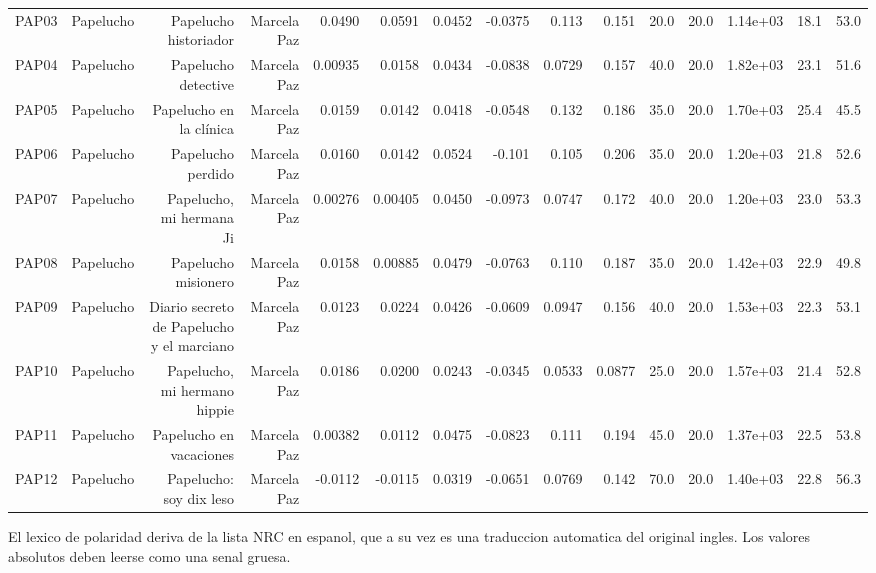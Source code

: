 \begin{table}[htbp]
\begin{tabular}{lrrrrrrrrrrrrrr}
PAP03 & Papelucho & Papelucho historiador & Marcela Paz & 0.0490 & 0.0591 & 0.0452 & -0.0375 & 0.113 & 0.151 & 20.0 & 20.0 & 1.14e+03 & 18.1 & 53.0 \\
PAP04 & Papelucho & Papelucho detective & Marcela Paz & 0.00935 & 0.0158 & 0.0434 & -0.0838 & 0.0729 & 0.157 & 40.0 & 20.0 & 1.82e+03 & 23.1 & 51.6 \\
PAP05 & Papelucho & Papelucho en la clínica & Marcela Paz & 0.0159 & 0.0142 & 0.0418 & -0.0548 & 0.132 & 0.186 & 35.0 & 20.0 & 1.70e+03 & 25.4 & 45.5 \\
PAP06 & Papelucho & Papelucho perdido & Marcela Paz & 0.0160 & 0.0142 & 0.0524 & -0.101 & 0.105 & 0.206 & 35.0 & 20.0 & 1.20e+03 & 21.8 & 52.6 \\
PAP07 & Papelucho & Papelucho, mi hermana Ji & Marcela Paz & 0.00276 & 0.00405 & 0.0450 & -0.0973 & 0.0747 & 0.172 & 40.0 & 20.0 & 1.20e+03 & 23.0 & 53.3 \\
PAP08 & Papelucho & Papelucho misionero & Marcela Paz & 0.0158 & 0.00885 & 0.0479 & -0.0763 & 0.110 & 0.187 & 35.0 & 20.0 & 1.42e+03 & 22.9 & 49.8 \\
PAP09 & Papelucho & Diario secreto de Papelucho y el marciano & Marcela Paz & 0.0123 & 0.0224 & 0.0426 & -0.0609 & 0.0947 & 0.156 & 40.0 & 20.0 & 1.53e+03 & 22.3 & 53.1 \\
PAP10 & Papelucho & Papelucho, mi hermano hippie & Marcela Paz & 0.0186 & 0.0200 & 0.0243 & -0.0345 & 0.0533 & 0.0877 & 25.0 & 20.0 & 1.57e+03 & 21.4 & 52.8 \\
PAP11 & Papelucho & Papelucho en vacaciones & Marcela Paz & 0.00382 & 0.0112 & 0.0475 & -0.0823 & 0.111 & 0.194 & 45.0 & 20.0 & 1.37e+03 & 22.5 & 53.8 \\
PAP12 & Papelucho & Papelucho: soy dix leso & Marcela Paz & -0.0112 & -0.0115 & 0.0319 & -0.0651 & 0.0769 & 0.142 & 70.0 & 20.0 & 1.40e+03 & 22.8 & 56.3 \\
\bottomrule
\end{tabular}
\vspace{0.5em}
\begin{minipage}{\linewidth}\footnotesize El lexico de polaridad deriva de la lista NRC en espanol, que a su vez es una traduccion automatica del original ingles. Los valores absolutos deben leerse como una senal gruesa.\end{minipage}
\end{table}

